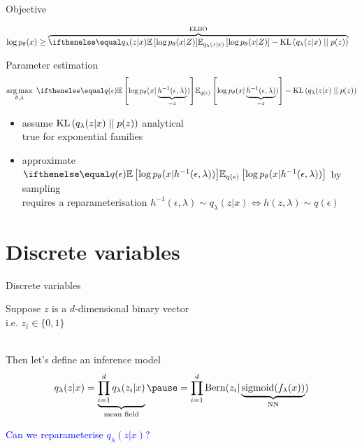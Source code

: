 \begin{frame}[plain]{Objective}

\begin{equation*}
\begin{aligned}
\log p_\theta(x) &\geq \overbrace{\E[q_\lambda(z|x)]{\log p_\theta(x|Z)} - \KL{q_\lambda(z|x)}{p(z)}}^{\ELBO} 
\end{aligned}
\end{equation*}

\pause

Parameter estimation
\begin{equation*}
\argmax_{\theta,\lambda} ~ \E[q(\epsilon)]{\log p_\theta(x|\underbrace{h^{-1}(\epsilon, \lambda)}_{=z})} - \KL{q_\lambda(z|x)}{p(z)}
\end{equation*}

\pause

\begin{itemize}
	\item assume $\operatorname{KL}\left(q_\lambda(z|x)\mid\mid p(z)\right)$  analytical\\
	true for exponential families \pause
	\item approximate $\E[q(\epsilon)]{\log p_\theta(x|h^{-1}(\epsilon, \lambda))}$ by sampling\\
	requires a reparameterisation $h^{-1}(\epsilon, \lambda) \sim q_\lambda(z|x)  \Leftrightarrow  h(z, \lambda) \sim q(\epsilon)$
\end{itemize}


\end{frame}

\section{Discrete variables}

\begin{frame}{Discrete variables}

Suppose $z$ is a $d$-dimensional binary vector \\
\quad i.e. $z_i \in \{0, 1\}$ \\

~ \pause

Then let's define an inference model
\begin{equation}
q_\lambda(z|x) = \underbrace{\prod_{i=1}^d q_\lambda(z_i|x)}_{\text{mean field}} \pause =  \prod_{i=1}^d \Bern(z_i|\underbrace{\sigmoid(f_\lambda(x))}_{\text{NN}})
\end{equation}


\pause

\textcolor{blue}{Can we reparameterise $q_\lambda(z|x)$? }


\end{frame}

